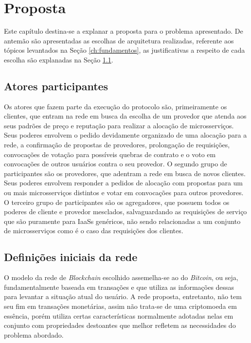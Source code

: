\chapter{Proposta}
\label{ch:proposta}

Este capítulo destina-se a explanar a proposta para o problema apresentado. De antemão são apresentadas as escolhas de arquitetura realizadas, referente aos tópicos levantados na Seção \ref{ch:fundamentos}, as justificativas a respeito de cada escolha são explanadas na Seção \ref{}. 

%
\section{Atores participantes}

Os atores que fazem parte da execução do protocolo são, primeiramente os clientes, que entram na rede em busca da escolha de um provedor que atenda aos seus padrões de preço e reputação para realizar a alocação de microsserviços. Seus poderes envolvem o pedido devidamente organizado de uma alocação para a rede, a confirmação de propostas de provedores, prolongação de requisições, convocações de votação para possíveis quebras de contrato e o voto em convocações de outros usuários contra o seu provedor. O segundo grupo de participantes são os provedores, que adentram a rede em busca de novos clientes. Seus poderes envolvem responder a pedidos de alocação com propostas para um ou mais microsserviços distintos e votar em convocações para outros provedores. O terceiro grupo de participantes são os agregadores, que possuem todos os poderes de cliente e provedor mesclados, salvaguardando as requisições de serviço que são puramente para \acp{IaaS} genéricos, não sendo relacionadas a um conjunto de microsserviços como é o caso das requisições dos clientes. 

\section{Definições iniciais da rede}
\label{sec:proposta:definicoes}

O modelo da rede de \textit{Blockchain} escolhido assemelha-se ao do \textit{Bitcoin}, ou seja, fundamentalmente baseada em transações e que utiliza as informações dessas para levantar a situação atual do usuário.
%
A rede proposta, entretanto, não tem seu fim em transações monetárias, assim não trata-se de uma criptomoeda em essência, porém utiliza certas características normalmente adotadas nelas em conjunto com propriedades destoantes que melhor refletem as necessidades do problema abordado.

